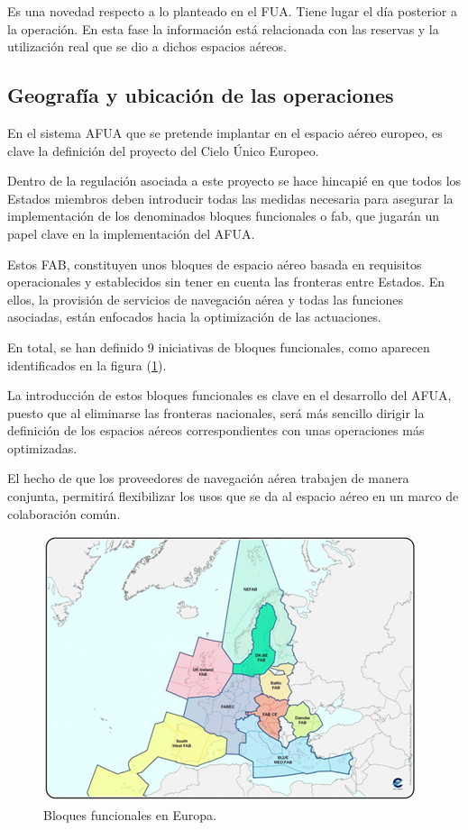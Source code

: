 Es una novedad respecto a lo planteado en el FUA. Tiene lugar el día posterior a la operación.
En esta fase la información está relacionada con las reservas y la utilización real que se dio a dichos espacios aéreos.

\subsection{Geografía y ubicación de las operaciones}

En el sistema AFUA que se pretende implantar en el espacio aéreo europeo, es clave la definición del proyecto del Cielo Único Europeo.

Dentro de la regulación asociada a este proyecto se hace hincapié en que todos los Estados miembros deben introducir todas las medidas necesaria para asegurar la implementación de los denominados bloques funcionales o \acrfull{fab}, que jugarán un papel clave en la implementación del AFUA.

Estos FAB, constituyen unos bloques de espacio aéreo basada en requisitos operacionales y establecidos sin tener en cuenta las fronteras entre Estados. En ellos, la provisión de servicios de navegación aérea y todas las funciones asociadas, están enfocados hacia la optimización de las actuaciones. 

En total, se han definido 9 iniciativas de bloques funcionales, como aparecen identificados en la figura (\ref{fig:fab}).

La introducción de estos bloques funcionales es clave en el desarrollo del AFUA, puesto que al eliminarse las fronteras nacionales, será más sencillo dirigir la definición de los espacios aéreos correspondientes con unas operaciones más optimizadas. 

El hecho de que los proveedores de navegación aérea trabajen de manera conjunta, permitirá flexibilizar los usos que se da al espacio aéreo en un marco de colaboración común.

\begin{figure}[H]
    \centering
    \includegraphics[width=0.8\linewidth]{figuras/fab.png}
    \caption{Bloques funcionales en Europa.}
    \label{fig:fab}
\end{figure}

